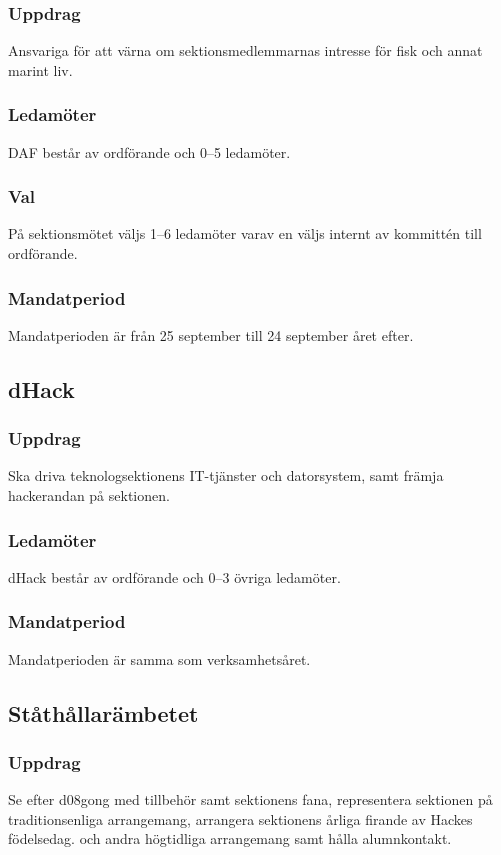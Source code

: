 \subsubsection{Uppdrag}
Ansvariga för att värna om sektionsmedlemmarnas intresse för fisk och
annat marint liv.
\subsubsection{Ledamöter}
DAF består av ordförande och 0--5 ledamöter. 
\subsubsection{Val}
På sektionsmötet väljs 1--6 ledamöter varav en väljs internt av kommittén till ordförande.
\subsubsection{Mandatperiod}
Mandatperioden är från 25 september till 24 september året efter.

\subsection{dHack}
\subsubsection{Uppdrag}
Ska driva teknologsektionens IT-tjänster och datorsystem, samt
främja hackerandan på sektionen.
\subsubsection{Ledamöter}
dHack består av ordförande och 0--3 övriga ledamöter.
\subsubsection{Mandatperiod}
Mandatperioden är samma som verksamhetsåret.

\subsection{Ståthållarämbetet}
\subsubsection{Uppdrag}
Se efter d08gong med tillbehör samt sektionens fana, representera sektionen på traditionsenliga arrangemang, arrangera sektionens årliga firande av Hackes födelsedag.
och andra högtidliga arrangemang samt hålla alumnkontakt.
